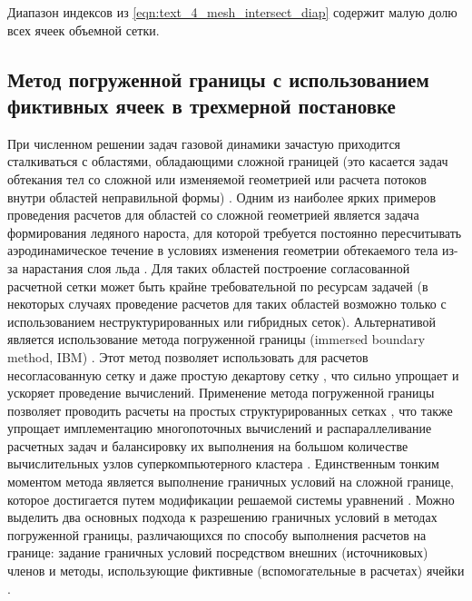 Диапазон индексов из \eqref{eqn:text_4_mesh_intersect_diap} содержит малую долю всех ячеек объемной сетки.


\subsection{Метод погруженной границы с использованием \mbox{фиктивных} ячеек в трехмерной постановке}\label{sec:text_1_immersed_boundary_method}

При численном решении задач газовой динамики зачастую приходится сталкиваться с областями, обладающими сложной границей (это касается задач обтекания тел со сложной или изменяемой геометрией или расчета потоков внутри областей неправильной формы) \cite{Mahesh2003Turbulent,Ye2020Grid}.
Одним из наиболее ярких примеров проведения расчетов для областей со сложной геометрией является задача формирования ледяного нароста, для которой требуется постоянно пересчитывать аэродинамическое течение в условиях изменения геометрии обтекаемого тела из-за нарастания слоя льда \cite{BourgaultCote2017,Tong2017Remesh,Wright2015LEWICE}.
Для таких областей построение согласованной расчетной сетки может быть крайне требовательной по ресурсам задачей (в некоторых случаях проведение расчетов для таких областей возможно только с использованием неструктурированных или гибридных сеток).
Альтернативой является использование метода погруженной границы (immersed boundary method, IBM\label{abbr:ibm-1}) \cite{Abalakin2018Immersed,Mori2008Immersed,Kim2004Immersed}.
Этот метод позволяет использовать для расчетов несогласованную сетку и даже простую декартову сетку \cite{Clarke1996Cartesian}, что сильно упрощает и ускоряет проведение вычислений.
Применение метода погруженной границы позволяет проводить расчеты на простых структурированных сетках \cite{Farrashkhalvat2003Grid,Rybakov2017Mesh}, что также упрощает имплементацию многопоточных вычислений и распараллеливание расчетных задач и балансировку их выполнения на большом количестве вычислительных узлов суперкомпьютерного кластера \cite{Savin2019RANSILES,Giordano2019Load}.
Единственным тонким моментом метода является выполнение граничных условий на сложной границе, которое достигается путем модификации решаемой системы уравнений \cite{Fadlun2000Immersed}.
Можно выделить два основных подхода к разрешению граничных условий в методах погруженной границы, различающихся по способу выполнения расчетов на границе: задание граничных условий посредством внешних (источниковых) членов \cite{Mittal2005Immersed} и методы, использующие фиктивные (вспомогательные в расчетах) ячейки \cite{Tseng2003Immersed}.

